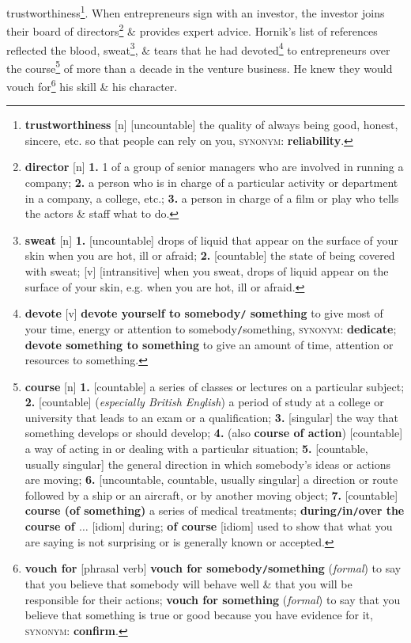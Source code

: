 \documentclass[oneside]{book}
\numberwithin{equation}{section}
\begin{document}
trustworthiness\footnote{\textbf{trustworthiness} [n] [uncountable] the quality of always being good, honest, sincere, etc. so that people can rely on you, \textsc{synonym}: \textbf{reliability}.}. When entrepreneurs sign with an investor, the investor joins their board of directors\footnote{\textbf{director} [n] \textbf{1.} 1 of a group of senior managers who are involved in running a company; \textbf{2.} a person who is in charge of a particular activity or department in a company, a college, etc.; \textbf{3.} a person in charge of a film or play who tells the actors \& staff what to do.} \& provides expert advice. Hornik's list of references reflected the blood, sweat\footnote{\textbf{sweat} [n] \textbf{1.} [uncountable] drops of liquid that appear on the surface of your skin when you are hot, ill or afraid; \textbf{2.} [countable] the state of being covered with sweat; [v] [intransitive] when you sweat, drops of liquid appear on the surface of your skin, e.g. when you are hot, ill or afraid.}, \& tears that he had devoted\footnote{\textbf{devote} [v] \textbf{devote yourself to somebody\texttt{/} something} to give most of your time, energy or attention to somebody\texttt{/}something, \textsc{synonym}: \textbf{dedicate}; \textbf{devote something to something} to give an amount of time, attention or resources to something.} to entrepreneurs over the course\footnote{\textbf{course} [n] \textbf{1.} [countable] a series of classes or lectures on a particular subject; \textbf{2.} [countable] (\textit{especially British English}) a period of study at a college or university that leads to an exam or a qualification; \textbf{3.} [singular] the way that something develops or should develop; \textbf{4.} (also \textbf{course of action}) [countable] a way of acting in or dealing with a particular situation; \textbf{5.} [countable, usually singular] the general direction in which somebody's ideas or actions are moving; \textbf{6.} [uncountable, countable, usually singular] a direction or route followed by a ship or an aircraft, or by another moving object; \textbf{7.} [countable] \textbf{course (of something)} a series of medical treatments; \textbf{during\texttt{/}in\texttt{/}over the course of $\ldots$} [idiom] during; \textbf{of course} [idiom] used to show that what you are saying is not surprising or is generally known or accepted.} of more than a decade in the venture business. He knew they would vouch for\footnote{\textbf{vouch for} [phrasal verb] \textbf{vouch for somebody\texttt{/}something} (\textit{formal}) to say that you believe that somebody will behave well \& that you will be responsible for their actions; \textbf{vouch for something} (\textit{formal}) to say that you believe that something is true or good because you have evidence for it, \textsc{synonym}: \textbf{confirm}.} his skill \& his character.
\end{document}
